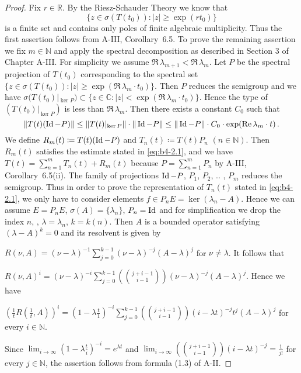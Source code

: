 \begin{proof}
	Fix $r \in \mathbb{R}$.
	By the Riesz-Schauder Theory we know that
	\[
    \{z \in \sigma(T(t_{0})) \colon |z| \geq \exp(rt_{0})\}
    \]
    is a finite set and contains only
	poles of finite algebraic multiplicity.
	Thus the first assertion
	follows from A-III, Corollary~6.5.
	To prove the remaining assertion we fix $m \in \mathbb{N}$ and apply the spectral
	decomposition as described in Section 3 of Chapter A-III.
	For simplicity we assume $\Re\,\lambda_{m+1} < \Re\,  \lambda_m$.
	Let $P$ be the spectral projection
	of $T(t_{0})$ corresponding to the spectral set $\{z \in \sigma(T(t_{0})) :
	|z| \geq \exp(\Re\,\lambda_m \cdot t_{0})\}$.
	Then $P$ reduces the semigroup and we have
	$\sigma(T(t_{0})|_{\ker P}) \subset \{z \in \mathbb{C} \colon |z| < \exp(\Re\,\lambda_m \cdot t_{0})\}$.
	Hence the type of
	$(T(t_{0})|_{\ker P})$ is less than $\Re\,\lambda_m$.
	Then there exists a constant $C_{0}$
	such that
%
%
\[
\|T(t)(\operatorname{Id} -P)\| \leq \|T(t)|_{\ker P}\|\cdot\|\operatorname{Id} -P\| \leq \|\operatorname{Id} -P\|\cdot C_{0} \cdot \exp(\mathop{}\!\mathrm{Re}\,\lambda_m \cdot t)\,.
\]
We define $R_m(t)  \coloneq  T(t)(\operatorname{Id} -P)$ and $T_n(t)  \coloneq  T(t)P_n$ $(n \in \mathbb{N})$.
Then $R_m(t)$ satisfies the estimate stated in \eqref{eq:b4-2.1}, and we have $T(t) =
\sum_{n=1}^m T_n(t) + R_m(t)$ because $P = \sum_{n=1}^m P_n$ by A-III, Corollary~6.5(ii).
The family of projections $\operatorname{Id} -P$, $P_1$, $P_2$, .. , $P_m$ reduces the semigroup.
Thus in order to prove the representation of $T_n(t)$ stated in
\eqref{eq:b4-2.1}, we only have to consider elements $f \in P_n E = \ker(\lambda_n-A)$.
Hence we can assume $E = P_n E$, $\sigma(A) = \{\lambda_n\}$, $P_n = \operatorname{Id} $ and for simplification
we drop the index $n$, \ie, $\lambda = \lambda_n$, $k = k(n)$.
Then $A$ is a bounded operator satisfying $(\lambda - A)^k = 0$ and its resolvent is given by

$R(\nu,A) = (\nu-\lambda)^{-1}\sum_{j=0}^{k-1}(\nu-\lambda)^{-j}(A-\lambda)^j$ for $\nu \neq \lambda$.
It follows that

$R(\nu,A)^i = (\nu-\lambda)^{-i}\sum_{j=0}^{k-1}(\binom{j+i-1}{i-1})(\nu-\lambda)^{-j}(A-\lambda)^j$.
Hence we have

$(\frac{1}{t}R(\frac{1}{t},A))^i = (1-\lambda\frac{t}{1})^{-i}\sum_{j=0}^{k-1}(\binom{j+i-1}{i-1})(i-\lambda t)^{-j}t^j(A-\lambda)^j$ for every $i \in \mathbb{N}$.

Since $\lim_{i\to\infty}(1-\lambda\frac{t}{i})^{-i} = e^{\lambda t}$ and $\lim_{i\to\infty}(\binom{j+i-1}{i-1})(i-\lambda t)^{-j} = \frac{1}{j!}$ for
every $j \in \mathbb{N}$, the assertion follows from formula (1.3) of A-II.
\end{proof}

